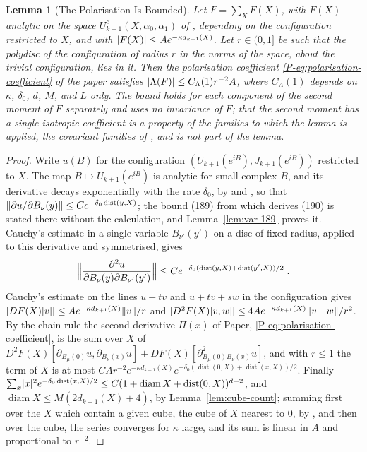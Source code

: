 \documentclass[11pt]{preprint}
\newcommand{\diam}{\operatorname{diam}}
\newcommand{\dist}{\operatorname{dist}}
\DeclarePairedDelimiter{\abs}{\lvert}{\rvert}
\DeclarePairedDelimiter{\norm}{\lVert}{\rVert}
\numberwithin{equation}{section}
\newtheorem{lemma}{Lemma}[section]
\theoremstyle{definition}
\theoremstyle{remark}
\theoremstyle{plain}
\begin{document}
\begin{lemma}[The Polarisation Is Bounded]\label{lem:polarisation-bounded}
Let $F = \sum_XF(X)$, with $F(X)$ analytic on the space $U^c_{k+1}(X, \alpha_0, \alpha_1)$ of \cite[(1.10)--(1.16), p.~262]{BalabanRG1}, depending on the configuration restricted to $X$, and with $\abs{F(X)} \leq Ae^{-\kappa d_{k+1}(X)}$. Let $r \in (0, 1]$ be such that the polydisc of the configuration of radius $r$ in the norms of the space, about the trivial configuration, lies in it. Then the polarisation coefficient \eqref{P-eq:polarisation-coefficient} of the paper satisfies $\abs{\Lambda(F)} \leq C_\Lambda(1)r^{-2}A$, where $C_\Lambda(1)$ depends on $\kappa$, $\delta_0$, $d$, $M$, and $L$ only. The bound holds for each component of the second moment of $F$ separately and uses no invariance of $F$; that the second moment has a single isotropic coefficient is a property of the families to which the lemma is applied, the covariant families of \cite[(2.29)]{BalabanCRE}, and is not part of the lemma.
\end{lemma}

\begin{proof}
Write $u(B)$ for the configuration $(U_{k+1}(e^{iB}), J_{k+1}(e^{iB}))$ restricted to $X$. The map $B \mapsto U_{k+1}(e^{iB})$ is analytic for small complex $B$, and its derivative decays exponentially with the rate $\delta_0$, by \cite[Proposition~9, p.~309]{BalabanVAR} and \cite[(190), p.~308]{BalabanVAR}, so that $\norm{\partial u/\partial B_\nu(y)} \leq Ce^{-\delta_0\dist(y, X)}$; the bound (189) from which \cite[p.~308]{BalabanVAR} derives (190) is stated there without the calculation, and Lemma~\ref{lem:var-189} proves it. Cauchy's estimate in a single variable $B_{\nu'}(y')$ on a disc of fixed radius, applied to this derivative and symmetrised, gives
\begin{equation}\label{eq:second-derivative-background}
    \Bigl\lVert\frac{\partial^2u}{\partial B_\nu(y)\partial B_{\nu'}(y')}\Bigr\rVert \leq Ce^{-\delta_0(\dist(y, X) + \dist(y', X))/2}\;.
\end{equation}
Cauchy's estimate on the lines $u + tv$ and $u + tv + sw$ in the configuration gives $\abs{DF(X)[v]} \leq Ae^{-\kappa d_{k+1}(X)}\norm{v}/r$ and $\abs{D^2F(X)[v, w]} \leq 4Ae^{-\kappa d_{k+1}(X)}\norm{v}\norm{w}/r^2$. By the chain rule the second derivative $\Pi(x)$ of Paper, \eqref{P-eq:polarisation-coefficient}, is the sum over $X$ of $D^2F(X)[\partial_{B_\mu(0)}u, \partial_{B_\nu(x)}u] + DF(X)[\partial^2_{B_\mu(0)B_\nu(x)}u]$, and with $r \leq 1$ the term of $X$ is at most $CAr^{-2}e^{-\kappa d_{k+1}(X)}e^{-\delta_0(\dist(0, X) + \dist(x, X))/2}$. Finally $\sum_x\abs{x}^2e^{-\delta_0\dist(x, X)/2} \leq C(1 + \diam X + \dist(0, X))^{d+2}$, and $\diam X \leq M(2d_{k+1}(X) + 4)$, by Lemma~\ref{lem:cube-count}; summing first over the $X$ which contain a given cube, the cube of $X$ nearest to $0$, by \cite[(1.26), p.~8]{BalabanRG2}, and then over the cube, the series converges for $\kappa$ large, and its sum is linear in $A$ and proportional to $r^{-2}$.
\end{proof}
\end{document}
